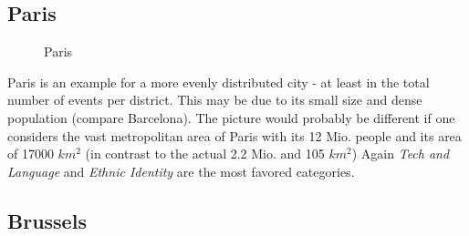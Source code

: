 \subsection*{Paris} 

\begin{figure}[!t]
	\hfill
	\caption{Paris}
\end{figure}

Paris is an example for a more evenly distributed city - at least in the total number of events per district. This may be due to its small size and dense population (compare Barcelona). The picture would probably be different if one considers the vast metropolitan area of Paris with its 12 Mio. people and its area of 17000 $ km^2 $ (in contrast to the actual 2.2 Mio. and 105 $ km^2 $)
Again \emph{Tech and Language} and \emph{Ethnic Identity} are the most favored categories.

\subsection*{Brussels}

